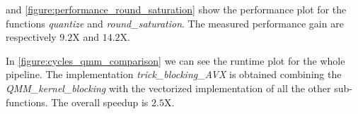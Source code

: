  and \cref{figure:performance_round_saturation} show the performance plot for the functions \emph{quantize} and \emph{round\_saturation}. The measured performance gain are respectively $9.2$X and $14.2$X. 

In \cref{figure:cycles_qmm_comparison} we can see the runtime plot for the whole pipeline. The implementation \emph{trick\_blocking\_AVX} is obtained combining the \emph{QMM\_kernel\_blocking} with the vectorized implementation of all the other sub-functions. The overall speedup is $2.5$X.